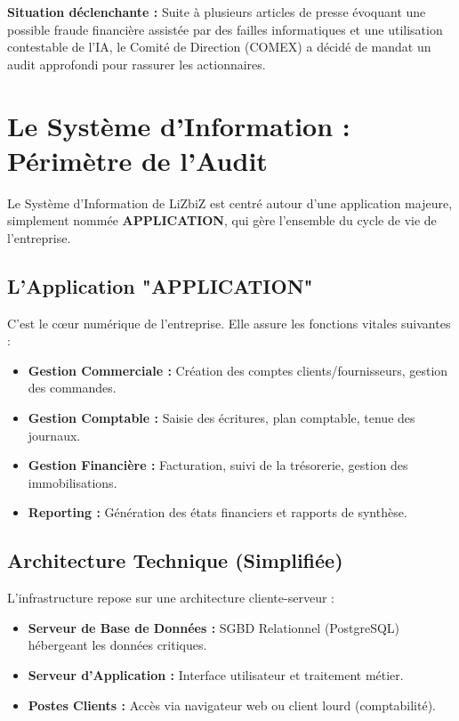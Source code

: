 \begin{boxlizbiz}
\textbf{Situation déclenchante :}
Suite à plusieurs articles de presse évoquant une possible fraude financière assistée par des failles informatiques et une utilisation contestable de l'IA, le Comité de Direction (COMEX) a décidé de mandat un audit approfondi pour rassurer les actionnaires.
\end{boxlizbiz}

\section{Le Système d'Information : Périmètre de l'Audit}

Le Système d'Information de LiZbiZ est centré autour d'une application majeure, simplement nommée \textbf{APPLICATION}, qui gère l'ensemble du cycle de vie de l'entreprise.

\subsection{L'Application "APPLICATION"}

C'est le cœur numérique de l'entreprise. Elle assure les fonctions vitales suivantes :
\begin{itemize}
    \item \textbf{Gestion Commerciale :} Création des comptes clients/fournisseurs, gestion des commandes.
    \item \textbf{Gestion Comptable :} Saisie des écritures, plan comptable, tenue des journaux.
    \item \textbf{Gestion Financière :} Facturation, suivi de la trésorerie, gestion des immobilisations.
    \item \textbf{Reporting :} Génération des états financiers et rapports de synthèse.
\end{itemize}

\subsection{Architecture Technique (Simplifiée)}

L'infrastructure repose sur une architecture cliente-serveur :
\begin{itemize}
    \item \textbf{Serveur de Base de Données :} SGBD Relationnel (PostgreSQL) hébergeant les données critiques.
    \item \textbf{Serveur d'Application :} Interface utilisateur et traitement métier.
    \item \textbf{Postes Clients :} Accès via navigateur web ou client lourd (comptabilité).
\end{itemize}

